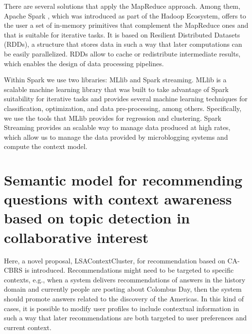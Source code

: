 \documentclass[preprint]{elsarticle}
\begin{document}
\begin{spacing}{1.5}
There are several solutions that apply the MapReduce approach. Among them, Apache Spark \cite{Zaharia2016}, which was introduced as part of the Hadoop Ecosystem, offers to the user a set of in-memory primitives that complement the MapReduce ones and that is suitable for iterative tasks. It is based on Resilient Distributed Datasets (RDDs), a structure that stores data in such a way that later computations can be easily parallelized. RDDs allow to cache or redistribute intermediate results, which enables the design of data processing pipelines.

Within Spark we use two libraries: MLlib and Spark streaming. MLlib is a scalable machine learning library \cite{Meng2016} that was built to take advantage of Spark suitability for iterative tasks and provides several machine learning techniques for classification, optimization, and data pre-processing, among others. Specifically, we use the tools that MLlib provides for regression and clustering. Spark Streaming \cite{Chintapalli2016} provides an scalable way to manage data produced at high rates, which allow us to manage the data provided by microblogging systems and compute the context model.

\section{Semantic model for recommending questions with context awareness based on topic detection in collaborative interest}
\label{sec:proposal}

Here, a novel proposal, LSAContextCluster, for recommendation based on CA-CBRS is introduced. Recommendations might need to be targeted to specific contexts, e.g., when a system delivers recommendations of answers in the history domain and currently people are posting about Colombus Day, then the system should promote answers related to the discovery of the Americas. In this kind of cases, it is possible to modify user profiles to include contextual information in such a way that later recommendations are both targeted to user preferences and current context.


\end{spacing}
\end{document}
